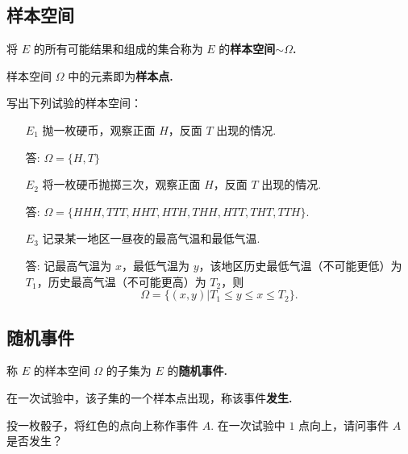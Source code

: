 \documentclass[12pt, a4paper, oneside, UTF8]{ctexbook}
\begin{document}
\subsection{样本空间}

\begin{defn}
    将 \(E\) 的所有可能结果和组成的集合称为 \(E\) 的\bf{样本空间}\(\sim \Omega\).
\end{defn}

\begin{defn}
    样本空间 \(\Omega\) 中的元素即为\bf{样本点}.
\end{defn}

\begin{example}
    写出下列试验的样本空间：
    \begin{enumerate}
        \item[\(E_1\)] 抛一枚硬币，观察正面 \(H\)，反面 \(T\) 出现的情况.
        \item[答:] \(\Omega = \{ H , T \}\)
        \item[\(E_2\)] 将一枚硬币抛掷三次，观察正面 \(H\)，反面 \(T\) 出现的情况.
        \item[答:] \(\Omega = \{HHH , TTT , HHT , HTH , THH , HTT , THT , TTH\}\).  
        \item[\(E_3\)] 记录某一地区一昼夜的最高气温和最低气温.
        \item[答:] 记最高气温为 \(x\)，最低气温为 \(y\)，该地区历史最低气温（不可能更低）为 \(T_1\)，历史最高气温（不可能更高）为 \(T_2\)，则
        \[
            \Omega = \{\left(x,y\right) | T_1 \leqslant y \leqslant x \leqslant T_2\}.
        \]
    \end{enumerate}
\end{example}

\subsection{随机事件}

\begin{defn}
    称 \(E\) 的样本空间 \(\Omega\) 的子集为 \(E\) 的\bf{随机事件}.
\end{defn}

\begin{defn}
    在一次试验中，该子集的一个样本点出现，称该事件\bf{发生}.
\end{defn}

\begin{example}
    投一枚骰子，将红色的点向上称作事件 \(A\). 在一次试验中 \(1\) 点向上，请问事件 \(A\) 是否发生？
\end{example}
\end{document}
